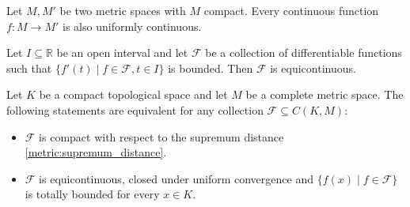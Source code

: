     \begin{theorem}
        Let $M,M'$ be two metric spaces with $M$ compact. Every continuous function $f:M\rightarrow M'$ is also uniformly continuous.
    \end{theorem}


    \begin{property}
        Let $I\subseteq\mathbb{R}$ be an open interval and let $\mathcal{F}$ be a collection of differentiable functions such that $\{f'(t)\mid f\in\mathcal{F},t\in I\}$ is bounded. Then $\mathcal{F}$ is equicontinuous.
    \end{property}

    \begin{theorem}
        Let $K$ be a compact topological space and let $M$ be a complete metric space. The following statements are equivalent for any collection $\mathcal{F}\subseteq C(K,M)$:
        \begin{itemize}
            \item $\mathcal{F}$ is compact with respect to the supremum distance \ref{metric:supremum_distance}.
            \item $\mathcal{F}$ is equicontinuous, closed under uniform convergence and $\{f(x)\mid f\in\mathcal{F}\}$ is totally bounded for every $x\in K$.
        \end{itemize}
    \end{theorem}
